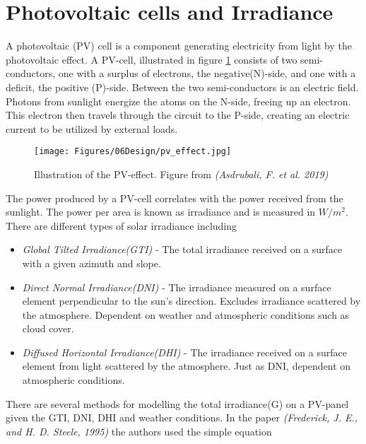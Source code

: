 \section{Photovoltaic cells and Irradiance}\label{seq:pv_and_irradiance}

A photovoltaic (PV) cell is a component generating electricity from light by the photovoltaic effect. A PV-cell, illustrated in figure \ref{fig:pv-effect} consists of two semi-conductors, one with a surplus of electrons, the negative(N)-side, and one with a deficit, the positive (P)-side. Between the two semi-conductors is an electric field. Photons from sunlight energize the atoms on the N-side, freeing up an electron. This electron then travels through the circuit to the P-side, creating an electric current to be utilized by external loads.\\

\begin{figure}
    \centering
    \texttt{[image: Figures/06Design/pv\_effect.jpg]}
    \caption[PV-effect]{Illustration of the PV-effect. Figure from \textit{(Asdrubali, F. et al. 2019)} \cite{Asdrubali2019441}}
    \label{fig:pv-effect}
\end{figure}

The power produced by a PV-cell correlates with the power received from the sunlight.\cite{Frederick1995} The power per area is known as irradiance and is measured in $W/m^2$. There are different types of solar irradiance including
\begin{itemize}
    \item \textit{Global Tilted Irradiance(GTI)}    -   The total irradiance received on a surface with a given azimuth and slope.
    \item \textit{Direct Normal Irradiance(DNI)}    -   The irradiance measured on a surface element perpendicular to the sun's direction. Excludes irradiance scattered by the atmosphere. Dependent on weather and atmospheric conditions such as cloud cover.
    \item \textit{Diffused Horizontal Irradiance(DHI)}  -   The irradiance received on a surface element from light scattered by the atmosphere. Just as DNI, dependent on atmospheric conditions.
\end{itemize}

There are several methods for modelling the total irradiance(G) on a PV-panel given the GTI, DNI, DHI and weather conditions. In the paper \textit{(Frederick, J. E., and H. D. Steele, 1995)} the authors used the simple equation

